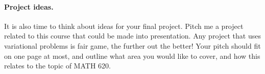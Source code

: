 \documentclass{article}
\begin{document}












\pagebreak





\paragraph{Project ideas.}
It is also time to think about ideas for your final project.
Pitch me a project related to this course that could be made into
presentation. Any project that uses variational problems is fair game,
the further out the better! Your pitch should fit on one page at most,
and outline what area you would like to cover, and how this relates to
the topic of MATH 620.
\end{document}

